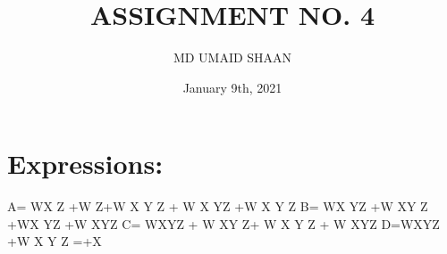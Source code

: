\documentclass{article}
\title{ASSIGNMENT NO. 4}
\author{MD UMAID SHAAN}
\date{January 9th, 2021}
\begin{document}
\maketitle

\section{Expressions:}
A= WX Z +W Z+W X Y Z + W X YZ +W X Y Z
B= WX YZ +W XY Z +WX YZ +W XYZ
C= WXYZ + W XY Z+ W X Y Z + W XYZ
D=WXYZ +W X Y Z =+X
\end{document}
